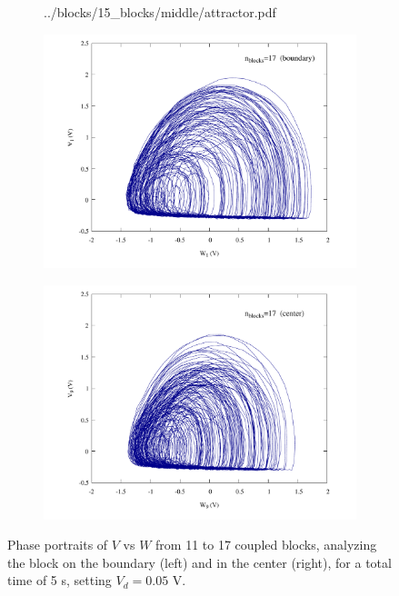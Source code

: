 \begin{figure}[!htbp]
\begin{minipage}{.47\textwidth}
\begin{subfigure}{\linewidth}
            {../blocks/15_blocks/middle/attractor.pdf}
        \end{subfigure}
    \end{minipage}
    \begin{minipage}{.47\textwidth}
        \begin{subfigure}{\linewidth}
            \centering
            \includegraphics[width=\linewidth]
            {../blocks/17_blocks/edge/attractor.pdf}
        \end{subfigure}
    \end{minipage}
    \begin{minipage}{.47\textwidth}
        \begin{subfigure}{\linewidth}
            \centering
            \includegraphics[width=\linewidth]
            {../blocks/17_blocks/middle/attractor.pdf}
        \end{subfigure}
    \end{minipage}
    \caption{Phase portraits of $V$ vs $W$ from 11 to 17 coupled blocks, analyzing the block on the boundary
    (left) and in the center (right), for a total time of 5 s, setting $V_d=0.05$ V.}\label{fig:attractors 11-17}
\end{figure}

